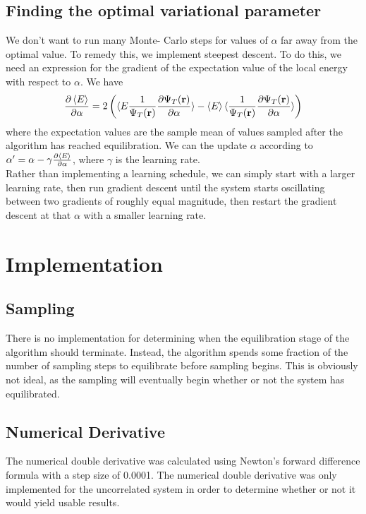 \documentclass[11pt,a4paper,titlepage]{article}
\begin{document}
\subsection{Finding the optimal variational parameter}
We don't want to run many Monte- Carlo steps for values of $\alpha$ far away from the optimal value. To remedy this, we implement steepest descent. To do this, we need an expression for the gradient of the expectation value of the local energy with respect to $\alpha$. We have
\begin{equation}
\frac{\partial \braket{E}}{\partial \alpha} = 2\left( \braket{E\frac{1}{\Psi_T(\mathbf{r})}\frac{\partial \Psi_T(\mathbf{r})}{\partial \alpha}} - \braket{E}\braket{\frac{1}{\Psi_T(\mathbf{r})}\frac{\partial \Psi_T(\mathbf{r})}{\partial \alpha}}\right)
\end{equation}
 where the expectation values are the sample mean of values sampled after the algorithm has reached equilibration. We can the update $\alpha$ according to 
$\alpha ' = \alpha -\gamma \frac{\partial \braket{E}}{\partial \alpha}$, where $\gamma$ is the learning rate.\\Rather than implementing a learning schedule, we can simply start with a larger learning rate, then run gradient descent until the system starts oscillating between two gradients of roughly equal magnitude, then restart the gradient descent at that $\alpha$ with a smaller learning rate.

\section{Implementation}
\subsection{Sampling}
There is no implementation for determining when the equilibration stage of the algorithm should terminate. Instead, the algorithm spends some fraction of the number of sampling steps to equilibrate before sampling begins. This is obviously not ideal, as the sampling will eventually begin whether or not the system has equilibrated. 
\subsection{Numerical Derivative}
The numerical double derivative was calculated using Newton's forward difference formula with a step size of 0.0001. The numerical double derivative was only implemented for the uncorrelated system in order to determine whether or not it would yield usable results.
\end{document}
